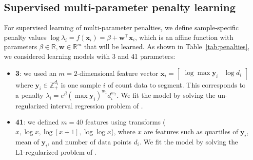 \documentclass{article}
\newcommand{\ZZ}{\mathbb Z}
\newcommand{\RR}{\mathbb R}
\begin{document}
\subsection{Supervised multi-parameter penalty learning}
\label{sec:supervised-multi}

For supervised learning of multi-parameter penalties, we
define sample-specific penalty values $\log \lambda_i = f(\mathbf
x_i)= \beta + \mathbf w^\intercal \mathbf x_i$, which is an affine
function with parameters $\beta\in\RR,\mathbf w\in\RR^m$ that will be
learned. As shown in Table~\ref{tab:penalties}, we considered learning
models with 3 and 41 parameters:

\begin{itemize}
\item \textbf{3}: we used an $m=2$-dimensional feature
  vector $\mathbf x_i = \left[\begin{array}{cc} \log\max \mathbf y_i &
      \log d_i
\end{array}\right]$ where $\mathbf y_i\in\ZZ_+^{d_i}$ 
is one sample $i$ of count data to segment.
This corresponds to a penalty $\lambda_i = e^\beta (\max\mathbf
y_i)^{w_1} d_i^{w_2}$. We fit the model by solving the un-regularized
interval regression problem of \citet{HOCKING-penalties}.
\item \textbf{41}: we defined $m=40$ features using transforms ($x,
  \log x, \log[x+1], \log\log x$), where $x$ are features such as
  quartiles of $\mathbf y_i$, mean of $\mathbf y_i$, and
  number of data points $d_i$. We fit the model by solving
  the L1-regularized problem of
  \citet{HOCKING-penalties}.
\end{itemize}
\end{document}
